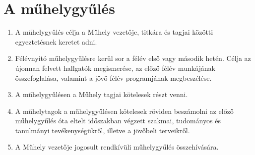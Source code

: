 \documentclass{../styles/rulebook}
\begin{document}
\section{A műhelygyűlés}

\begin{enumerate}
	\item A műhelygyűlés célja a Műhely vezetője, titkára és tagjai közötti egyeztetésnek keretet adni.
	\item Félévnyitó műhelygyűlésre kerül sor a félév első vagy második hetén. Célja az újonnan felvett hallgatók megismerése, az előző félév munkájának összefoglalása, valamint a jövő félév programjának megbeszélése.
	\item A műhelygyűlésen a Műhely tagjai kötelesek részt venni.
	\item A műhelytagok a műhelygyűlésen kötelesek röviden beszámolni az előző műhelygyűlés óta eltelt időszakban végzett szakmai, tudományos és tanulmányi tevékenységükről, illetve a jövőbeli terveikről.
	\item A Műhely vezetője jogosult rendkívüli műhelygyűlés összehívására.
\end{enumerate}
\end{document}
